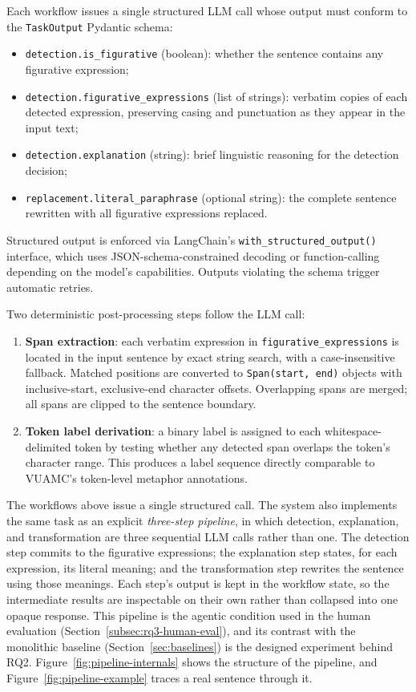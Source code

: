 Each workflow issues a single structured LLM call whose output must conform to the \texttt{TaskOutput} Pydantic schema:
\begin{itemize}
    \item \texttt{detection.is\_figurative} (boolean): whether the sentence contains any figurative expression;
    \item \texttt{detection.figurative\_expressions} (list of strings): verbatim copies of each detected expression, preserving casing and punctuation as they appear in the input text;
    \item \texttt{detection.explanation} (string): brief linguistic reasoning for the detection decision;
    \item \texttt{replacement.literal\_paraphrase} (optional string): the complete sentence rewritten with all figurative expressions replaced.
\end{itemize}

Structured output is enforced via LangChain's \texttt{with\_structured\_output()} interface, which uses JSON-schema-constrained decoding or function-calling depending on the model's capabilities. Outputs violating the schema trigger automatic retries.

Two deterministic post-processing steps follow the LLM call:
\begin{enumerate}
    \item \textbf{Span extraction}: each verbatim expression in \texttt{figurative\_expressions} is located in the input sentence by exact string search, with a case-insensitive fallback. Matched positions are converted to \texttt{Span(start, end)} objects with inclusive-start, exclusive-end character offsets. Overlapping spans are merged; all spans are clipped to the sentence boundary.
    \item \textbf{Token label derivation}: a binary label is assigned to each whitespace-delimited token by testing whether any detected span overlaps the token's character range. This produces a label sequence directly comparable to VUAMC's token-level metaphor annotations.
\end{enumerate}

The workflows above issue a single structured call. The system also implements the same task as an explicit \textit{three-step pipeline}, in which detection, explanation, and transformation are three sequential LLM calls rather than one. The detection step commits to the figurative expressions; the explanation step states, for each expression, its literal meaning; and the transformation step rewrites the sentence using those meanings. Each step's output is kept in the workflow state, so the intermediate results are inspectable on their own rather than collapsed into one opaque response. This pipeline is the agentic condition used in the human evaluation (Section~\ref{subsec:rq3-human-eval}), and its contrast with the monolithic baseline (Section~\ref{sec:baselines}) is the designed experiment behind RQ2. Figure~\ref{fig:pipeline-internals} shows the structure of the pipeline, and Figure~\ref{fig:pipeline-example} traces a real sentence through it.

